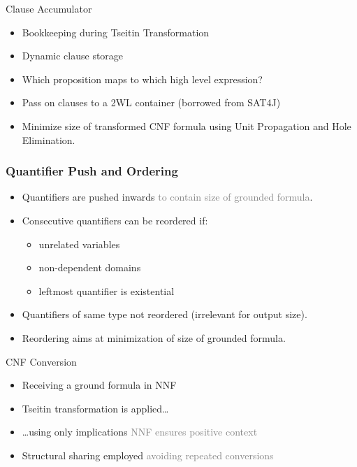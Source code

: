 \documentclass[smaller,dvipsnames,ratio=169]{beamer}
\begin{document}
  \begin{frame}{Clause Accumulator}
    \begin{itemize}
      \item \alert{Bookkeeping} during Tseitin Transformation
      \item Dynamic clause storage
      \item Which proposition maps to which high level expression?
      \item Pass on clauses to a 2WL container (borrowed from SAT4J)
      \item \alert{Minimize} size of transformed CNF formula using Unit Propagation and Hole Elimination.
    \end{itemize}
  \end{frame}
  
  \begin{frame}
    \frametitle{Quantifier Push and Ordering}
    \begin{itemize}
      \item Quantifiers are pushed \alert{inwards} \textcolor{gray}{to contain size of grounded formula}.
      \item Consecutive quantifiers can be reordered if:
      \begin{itemize}
        \item unrelated variables
        \item \alert{non-dependent} domains 
        \item leftmost quantifier is existential
      \end{itemize}
      \item Quantifiers of same type not reordered (irrelevant for output size).
      \item Reordering aims at \alert{minimization} of size of grounded formula.
    \end{itemize}
  \end{frame}

  \begin{frame}{CNF Conversion}
    \begin{itemize}
      \item Receiving a ground formula in NNF 
      \item \alert{Tseitin transformation} is applied\ldots
      \item \ldots{}using only \alert{implications} \textcolor{gray}{NNF ensures positive context}
      \item Structural \alert{sharing} employed \textcolor{gray}{avoiding repeated conversions} %
    \end{itemize}
  \end{frame}
\end{document}
